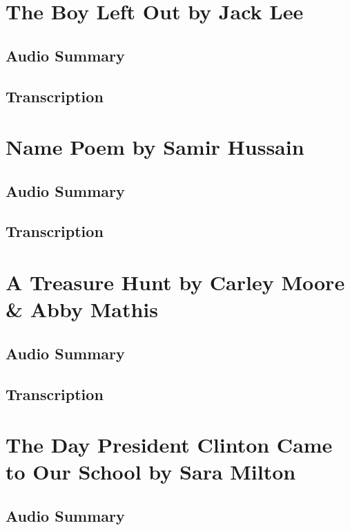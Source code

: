 \section{The Boy Left Out by Jack Lee}

\subsection{Audio Summary}

\subsection{Transcription}

\section{Name Poem by Samir Hussain}

\subsection{Audio Summary}

\subsection{Transcription}

\section{A Treasure Hunt by Carley Moore \& Abby Mathis}

\subsection{Audio Summary}

\subsection{Transcription}

\section{The Day President Clinton Came to Our School by Sara Milton}

\subsection{Audio Summary}

